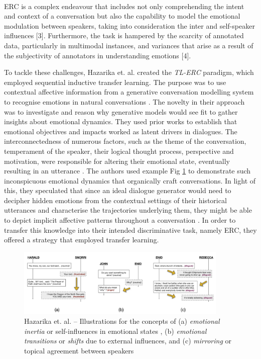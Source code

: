 \\
ERC is a complex endeavour that includes not only comprehending the intent and context of a conversation but also the capability to model the emotional modulation between speakers, taking into consideration the inter and self-speaker influences [3]. Furthermore, the task is hampered by the scarcity of annotated data, particularly in multimodal instances, and variances that arise as a result of the subjectivity of annotators in understanding emotions [4]. 

To tackle these challenges, Hazarika et. al. created the \textit{TL-ERC} paradigm, which employed sequential inductive transfer learning. The purpose was to use contextual affective information from a generative conversation modelling system to recognise emotions in natural conversations \cite{Hazarika2019ConversationalTL}. The novelty in their approach was to investigate and reason why generative models would see fit to gather insights about emotional dynamics. They used prior works to establish that emotional objectives and impacts worked as latent drivers in dialogues. The interconnectedness of numerous factors, such as the theme of the conversation, temperament of the speaker, their logical thought process, perspective and motivation, were responsible for altering their emotional state, eventually resulting in an utterance \cite{Weigand+1998+35+48, Poria2019EmotionRI}. The authors used example Fig \ref{emotional_dynamics} to demonstrate such inconspicuous emotional dynamics that organically craft conversations. In light of this, they speculated that since an ideal dialogue generator would need to decipher hidden emotions from the contextual settings of their historical utterances and characterise the trajectories underlying them, they might be able to depict implicit affective patterns throughout a conversation \cite{Shimizu2018PretrainingSC}. In order to transfer this knowledge into their intended discriminative task, namely ERC, they offered a strategy that employed transfer learning.

\begin{figure}[ht]
\centering
\includegraphics[width=0.9\textwidth]{Figures/Fig1-5.png}
\captionsetup{justification=centering}
\caption{Hazarika et. al. \cite{Hazarika2019ConversationalTL} -- Illustrations for the concepts of (a) \textit{emotional inertia} or self-influences in emotional states \cite{Koval2012ChangingED}, (b) \textit{emotional transitions} or \textit{shifts} due to external influences, and (c) \textit{mirroring} or topical agreement between speakers \cite{Navarretta2016MirroringFE}}
 \label{emotional_dynamics}
\end{figure}

